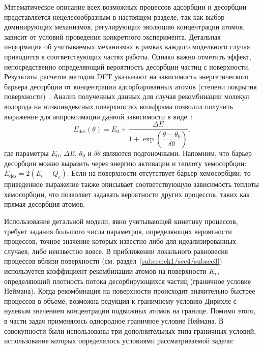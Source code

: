 Математическое описание всех возможных процессов адсорбции и десорбции представляется нецелесообразным в настоящем разделе, так как выбор доминирующих механизмов, регулирующих эволюцию концентрации атомов, зависит от условий проведения конкретного эксперимента. Детальная информация об учитываемых механизмах в рамках каждого модельного случая приводится в соответствующих частях работы. Однако важно отметить эффект, непосредственно определяющий вероятность десорбции частиц с поверхности. Результаты расчетов методом DFT указывают на зависимость энергетического барьера десорбции от концентрации адсорбированных атомов (степени покрытия поверхности)~\cite{Piazza2018,Ajmalghan2019,Ferro2023}. Анализ полученных данных для случая рекомбинации молекул водорода на низкоиндексных поверхностях вольфрама позволил получить выражение для аппроксимации данной зависимости в виде~\cite{Hodille2021}:
\begin{equation}
    \label{eq:ch2/Edes_coverage}
    E_\mathrm{des}(\theta) = E_0 + \dfrac{\Delta E}{1+\exp\left( \dfrac{\theta-\theta_0}{\delta\theta} \right)},
\end{equation}
где параметры $E_0$, $\Delta E$, $\theta_0$ и $\delta\theta$ являются подгоночными. Напомним, что барьер десорбции можно выразить через энергию активации и теплоту хемосорбции: \( E_\mathrm{des} = 2(E_\mathrm{c}-Q_\mathrm{c}) \). Если на поверхности отсутствует барьер хемосорбции, то приведенное выражение также описывает соответствующую зависимость теплоты хемосорбции, что позволяет задавать вероятности других процессов, таких как прямая десорбция атомов.

Использование детальной модели, явно учитывающей кинетику процессов, требует задания большого числа параметров, определяющих вероятности процессов, точное значение которых известно либо для идеализированных случаев, либо неизвестно вовсе. В приближении локального равновесия процессов вблизи поверхности (см. раздел~\cref{subsec:ch1/sec4/subsec3}) используется коэффициент рекомбинации атомов на поверхности \( K_\mathrm{r} \), определяющий плотность потока десорбирующихся частиц (граничное условие Неймана). Когда рекомбинация на поверхности происходит значительно быстрее процессов в объеме, возможна редукция к граничному условию Дирихле с нулевым значением концентрации подвижных атомов на границе. Помимо этого, в части задач применялось однородное граничное условие Неймана. В совокупности были использованы три дополнительных типа граничных условий, использование которых определялось условиями рассматриваемой задачи:

